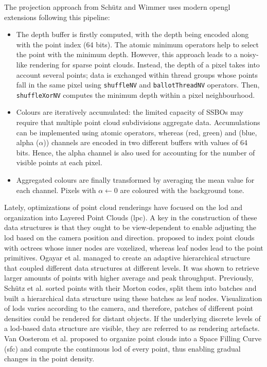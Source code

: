 \begin{kaobox}[frametitle=Compute shader core proposed by Schütz and Wimmer]
The projection approach from Schütz and Wimmer \cite{schutz_rendering_2021} uses modern \acrshort{opengl} extensions following this pipeline:
\begin{itemize}
    \item The depth buffer is firstly computed, with the depth being encoded along with the point index (64 bits). The atomic minimum operators help to select the point with the minimum depth. However, this approach leads to a noisy-like rendering for sparse point clouds. Instead, the depth of a pixel takes into account several points; data is exchanged within thread groups whose points fall in the same pixel using \verb|shuffleNV| and \verb|ballotThreadNV| operators. Then, \verb|shuffleXorNV| computes the minimum depth within a pixel neighbourhood.
    \item Colours are iteratively accumulated: the limited capacity of SSBOs may require that multiple point cloud subdivisions aggregate data. Accumulations can be implemented using atomic operators, whereas (red, green) and (blue, alpha ($\alpha$)) channels are encoded in two different buffers with values of 64 bits. Hence, the alpha channel is also used for accounting for the number of visible points at each pixel.
    \item Aggregated colours are finally transformed by averaging the mean value for each channel. Pixels with $\alpha \gets 0$ are coloured with the background tone. 
\end{itemize}
\end{kaobox}

Lately, optimizations of point cloud renderings have focused on the \acrshort{lod} and organization into Layered Point Clouds (\acrshort{lpc}). A key in the construction of these data structures is that they ought to be view-dependent to enable adjusting the \acrshort{lod} based on the camera position and direction. \cite{schutz_gpu-accelerated_2023} proposed to index point clouds with octrees whose inner nodes are voxelized, whereas leaf nodes lead to the point primitives. Ogayar et al. \cite{ogayar-anguita_nested_2023} managed to create an adaptive hierarchical structure that coupled different data structures at different levels. It was shown to retrieve larger amounts of points with higher average and peak throughput. Previously, Schütz et al. \cite{schutz_software_2022} sorted points with their Morton codes, split them into batches and built a hierarchical data structure using these batches as leaf nodes. Visualization of \acrshort{lod}s varies according to the camera, and therefore, patches of different point densities could be rendered for distant objects. If the underlying discrete levels of a \acrshort{lod}-based data structure are visible, they are referred to as rendering artefacts. Van Oosterom et al. \cite{van_oosterom_organizing_2022} proposed to organize point clouds into a Space Filling Curve (\acrshort{sfc}) and compute the continuous \acrshort{lod} of every point, thus enabling gradual changes in the point density. 

